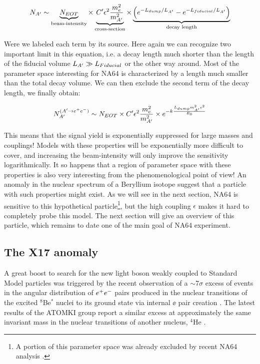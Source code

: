 \begin{equation}
  \label{eq:dm-rate-vis}
    N_{A'} \sim \underbrace{N_{EOT}}_{\textrm{beam-intensity}} \times \underbrace{C' \epsilon^2 \frac{m_e^2}{m^2_{A'}}}_{\textrm{cross-section}} \times \underbrace{\left(e^{- L_{dump}/L_{A'}} - e^{-L_{fiducial}/L_{A'}}\right)}_{\textrm{decay length}}
  \end{equation}

  Were we labeled each term by its source. Here again we can recognize two important limit in this equation, i.e. a decay length much shorter than the length of the fiducial volume $L_{A'} \gg L_{Fiducial}$ or the other way around. Most of the parameter space interesting for NA64 is characterized by a length much smaller than the total decay volume. We can then exclude the second term of the decay length, we finally obtain:

  \begin{equation}
    \label{eq:dm-rate-vis-limit}
    N_{A'}^{(A' \to e^+e^-)} \sim N_{EOT} \times C' \epsilon^2 \frac{m_e^2}{m^2_{A'}} \times e^{-k\frac{L_{dump} m^2_{A'}\epsilon^2}{E_0}}
  \end{equation}

  This means that the signal yield is exponentially suppressed for large masses and couplings! Models with these properties will be exponentially more difficult to cover, and increasing the beam-intensity will only improve the sensitivity logarithmically. It so happens that a region of parameter space with these properties is also very interesting from the phenomenological point of view! An anomaly in the nuclear spectrum of a Beryllium isotope suggest that a particle with such properties might exist. As we will see in the next section, NA64 is sensitive to this hypothetical particle\footnote{A portion of this parameter space was already excluded by recent NA64 analysis \cite{Banerjee:2019hmi,Banerjee:2018vgk}.}, but the high coupling $\epsilon$ makes it hard to completely probe this model. The next section will give an overview of this particle, which remains to date one of the main goal of NA64 experiment.

\subsection{The X17 anomaly}
\label{ch1:sec:dm-u1model-motivations-x17}

A great boost to search for the new light boson weakly coupled to Standard Model particles was triggered by the recent observation of a $\sim$7$\sigma$ excess of events in the angular distribution of $e^+e^-$ pairs produced in the nuclear transitions of the excited $^8$Be$^*$ nuclei to its ground state via internal $\ee$ pair creation \cite{Krasznahorkay:2015iga}. The latest results of the ATOMKI group report a similar excess at approximately the same invariant mass in the nuclear transitions of another nucleus, $^4$He \cite{Krasznahorkay:2019lyl}.


